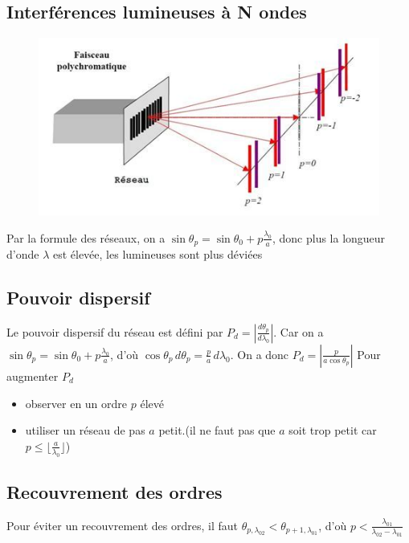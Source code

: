 \documentclass[a4paper,12pt]{book}
\begin{document}
\subsection{Interférences lumineuses à N ondes}
\begin{figure}[h]
    \begin{center}
    \includegraphics[scale=0.4]{tr143.jpg}
    \end{center}
\end{figure}
Par la formule des réseaux, on a $\sin\theta_p=\sin\theta_0+p\frac{\lambda_0}{a}$, donc plus la longueur d'onde $\lambda$ est élevée, les lumineuses sont plus 
déviées
\subsection{Pouvoir dispersif}
Le pouvoir dispersif du réseau est défini par $P_d=\left|\frac{d\theta_p}{d\lambda_0}\right|$. Car on a $\sin\theta_p=\sin\theta_0+p\frac{\lambda_0}{a}$, 
d'où $\cos\theta_p\,d\theta_p=\frac{p}{a}\,d\lambda_0$. On a donc $P_d=\left|\frac{p}{a\cos\theta_p}\right|$
Pour augmenter $P_d$
\begin{itemize}
    \item observer en un ordre $p$ élevé
    \item utiliser un réseau de pas $a$ petit.(il ne faut pas que $a$ soit trop petit car $p\leq \lfloor\frac{a}{\lambda_0}\rfloor$)
\end{itemize}

\subsection{Recouvrement des ordres}
Pour éviter un recouvrement des ordres, il faut $\theta_{p,\lambda_{02}}<\theta_{p+1,\lambda_{01}}$, 
d'où $p<\frac{\lambda_{01}}{\lambda_{02}-\lambda_{01}}$
\end{document}
